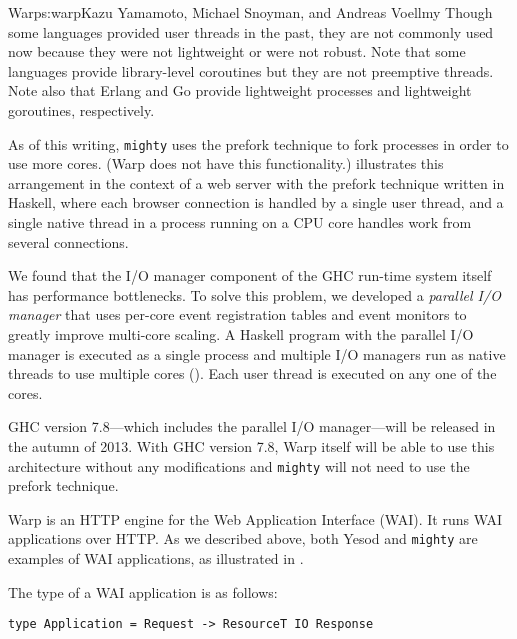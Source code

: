 \begin{aosachapter}{Warp}{s:warp}{Kazu Yamamoto, Michael Snoyman, and Andreas Voellmy}
Though some languages provided user threads in the past, they are not
commonly used now because they were not lightweight or were not robust.
Note that some languages provide library-level coroutines but they are
not preemptive threads. Note also that Erlang and Go provide lightweight
processes and lightweight goroutines, respectively.

As of this writing, \texttt{mighty} uses the prefork technique to fork
processes in order to use more cores. (Warp does not have this
functionality.)  illustrates this arrangement in
the context of a web server with the prefork technique written in
Haskell, where each browser connection is handled by a single user
thread, and a single native thread in a process running on a CPU core
handles work from several connections.


We found that the I/O manager component of the GHC run-time system
itself has performance bottlenecks. To solve this problem, we developed
a \emph{parallel I/O manager} that uses per-core event registration
tables and event monitors to greatly improve multi-core scaling. A
Haskell program with the parallel I/O manager is executed as a single
process and multiple I/O managers run as native threads to use multiple
cores (). Each user thread is executed on any
one of the cores.


GHC version 7.8---which includes the parallel I/O manager---will be
released in the autumn of 2013. With GHC version 7.8, Warp itself will
be able to use this architecture without any modifications and
\texttt{mighty} will not need to use the prefork technique.


\label{sec.warp.arch}

Warp is an HTTP engine for the Web Application Interface (WAI). It runs
WAI applications over HTTP. As we described above, both Yesod and
\texttt{mighty} are examples of WAI applications, as illustrated in
.


The type of a WAI application is as follows:

\begin{verbatim}
type Application = Request -> ResourceT IO Response
\end{verbatim}


\end{aosachapter}
